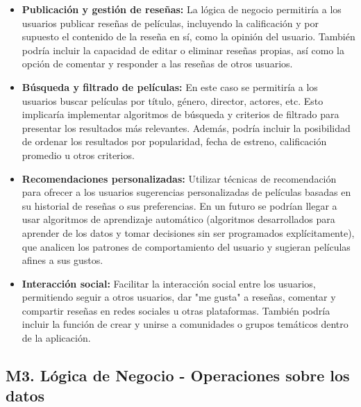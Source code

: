 \begin{itemize}
\item \textbf{Publicación y gestión de reseñas:} La lógica de negocio permitiría a los usuarios publicar reseñas de películas, incluyendo la calificación y por supuesto el contenido de la reseña en sí, como la opinión del usuario. También podría incluir la capacidad de editar o eliminar reseñas propias, así como la opción de comentar y responder a las reseñas de otros usuarios.
\item \textbf{Búsqueda y filtrado de películas:} En este caso se permitiría a los usuarios buscar películas por título, género, director, actores, etc. Esto implicaría implementar algoritmos de búsqueda y criterios de filtrado para presentar los resultados más relevantes. Además, podría incluir la posibilidad de ordenar los resultados por popularidad, fecha de estreno, calificación promedio u otros criterios.
\item \textbf{Recomendaciones personalizadas:} Utilizar técnicas de recomendación para ofrecer a los usuarios sugerencias personalizadas de películas basadas en su historial de reseñas o sus preferencias. En un futuro se podrían llegar a usar algoritmos de aprendizaje automático (algoritmos desarrollados para aprender de los datos y tomar decisiones sin ser programados explícitamente), que analicen los patrones de comportamiento del usuario y sugieran películas afines a sus gustos.
\item \textbf{Interacción social:} Facilitar la interacción social entre los usuarios, permitiendo seguir a otros usuarios, dar "me gusta" a reseñas, comentar y compartir reseñas en redes sociales u otras plataformas. También podría incluir la función de crear y unirse a comunidades o grupos temáticos dentro de la aplicación.
\end{itemize}

\subsection{M3. Lógica de Negocio - Operaciones sobre los datos}